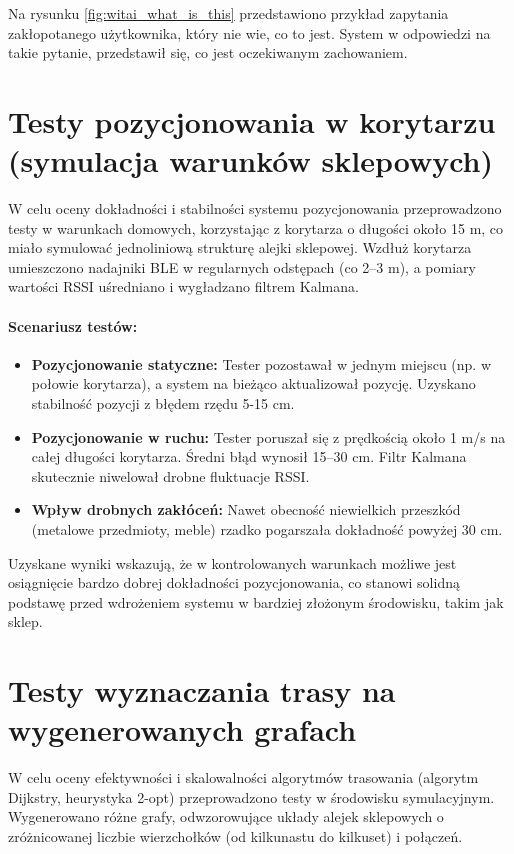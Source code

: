 Na rysunku \ref{fig:witai_what_is_this} przedstawiono przykład zapytania zakłopotanego użytkownika, który nie wie, co to jest. System w odpowiedzi na takie pytanie, przedstawił się, co jest oczekiwanym zachowaniem.


\section{Testy pozycjonowania w korytarzu (symulacja warunków sklepowych)}
\label{subsec:testy_pozycjonowania_korytarz}

W celu oceny dokładności i stabilności systemu pozycjonowania przeprowadzono testy w warunkach domowych, korzystając z korytarza o długości około 15 m, co miało symulować jednoliniową strukturę alejki sklepowej. Wzdłuż korytarza umieszczono nadajniki BLE w regularnych odstępach (co 2--3 m), a pomiary wartości RSSI uśredniano i wygładzano filtrem Kalmana.

\paragraph{Scenariusz testów:} 
\begin{itemize}
    \item \textbf{Pozycjonowanie statyczne:} Tester pozostawał w jednym miejscu (np. w połowie korytarza), a system na bieżąco aktualizował pozycję. Uzyskano stabilność pozycji z błędem rzędu 5-15 cm.
    \item \textbf{Pozycjonowanie w ruchu:} Tester poruszał się z prędkością około 1 m/s na całej długości korytarza. Średni błąd wynosił 15--30 cm. Filtr Kalmana skutecznie niwelował drobne fluktuacje RSSI.
    \item \textbf{Wpływ drobnych zakłóceń:} Nawet obecność niewielkich przeszkód (metalowe przedmioty, meble) rzadko pogarszała dokładność powyżej 30 cm.
\end{itemize}

Uzyskane wyniki wskazują, że w kontrolowanych warunkach możliwe jest osiągnięcie bardzo dobrej dokładności pozycjonowania, co stanowi solidną podstawę przed wdrożeniem systemu w bardziej złożonym środowisku, takim jak sklep.


\section{Testy wyznaczania trasy na wygenerowanych grafach}
\label{subsec:testy_trasowania_grafy}

W celu oceny efektywności i skalowalności algorytmów trasowania (algorytm Dijkstry, heurystyka 2-opt) przeprowadzono testy w środowisku symulacyjnym. Wygenerowano różne grafy, odwzorowujące układy alejek sklepowych o zróżnicowanej liczbie wierzchołków (od kilkunastu do kilkuset) i połączeń.

